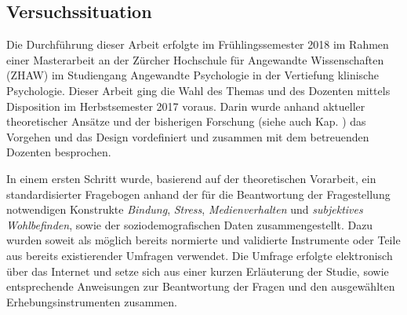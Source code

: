 \subsection{Versuchssituation}\label{sec:Versuchssituation}
Die Durchführung dieser Arbeit erfolgte im Frühlingssemester 2018 im Rahmen einer Masterarbeit an der Zürcher Hochschule für Angewandte Wissenschaften (ZHAW) im Studiengang Angewandte Psychologie in der Vertiefung klinische Psychologie. Dieser Arbeit ging die Wahl des Themas und des Dozenten mittels Disposition im Herbstsemester 2017 voraus. Darin wurde anhand aktueller theoretischer Ansätze und der bisherigen Forschung (siehe auch Kap. ) das Vorgehen und das Design vordefiniert und zusammen mit dem betreuenden Dozenten besprochen. 

In einem ersten Schritt wurde, basierend auf der theoretischen Vorarbeit, ein standardisierter Fragebogen anhand der für die Beantwortung der Fragestellung notwendigen Konstrukte \textit{Bindung}, \textit{Stress}, \textit{Medienverhalten} und \textit{subjektives Wohlbefinden}, sowie der soziodemografischen Daten zusammengestellt. Dazu wurden soweit als möglich bereits normierte und validierte Instrumente oder Teile aus bereits existierender Umfragen verwendet. Die Umfrage erfolgte elektronisch über das Internet und setze sich aus einer kurzen Erläuterung der Studie, sowie entsprechende Anweisungen zur Beantwortung der Fragen und den ausgewählten Erhebungsinstrumenten zusammen. 

